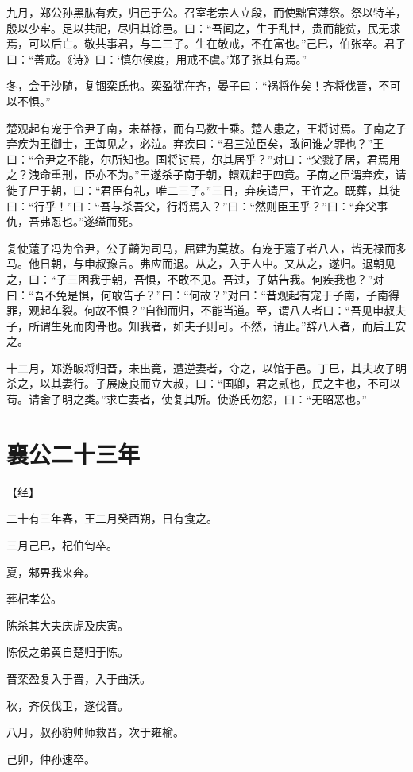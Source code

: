 \documentclass[a4paper,12pt,UTF8,twoside]{ctexbook}
\begin{document}
九月，郑公孙黑肱有疾，归邑于公。召室老宗人立段，而使黜官薄祭。祭以特羊，殷以少牢。足以共祀，尽归其馀邑。曰：“吾闻之，生于乱世，贵而能贫，民无求焉，可以后亡。敬共事君，与二三子。生在敬戒，不在富也。”己巳，伯张卒。君子曰：“善戒。《诗》曰：‘慎尔侯度，用戒不虞。’郑子张其有焉。”

冬，会于沙随，复锢栾氏也。栾盈犹在齐，晏子曰：“祸将作矣！齐将伐晋，不可以不惧。”

楚观起有宠于令尹子南，未益禄，而有马数十乘。楚人患之，王将讨焉。子南之子弃疾为王御士，王每见之，必泣。弃疾曰：“君三泣臣矣，敢问谁之罪也？”王曰：“令尹之不能，尔所知也。国将讨焉，尔其居乎？”对曰：“父戮子居，君焉用之？洩命重刑，臣亦不为。”王遂杀子南于朝，轘观起于四竟。子南之臣谓弃疾，请徙子尸于朝，曰：“君臣有礼，唯二三子。”三日，弃疾请尸，王许之。既葬，其徒曰：“行乎！”曰：“吾与杀吾父，行将焉入？”曰：“然则臣王乎？”曰：“弃父事仇，吾弗忍也。”遂缢而死。

复使薳子冯为令尹，公子齮为司马，屈建为莫敖。有宠于薳子者八人，皆无禄而多马。他日朝，与申叔豫言。弗应而退。从之，入于人中。又从之，遂归。退朝见之，曰：“子三困我于朝，吾惧，不敢不见。吾过，子姑告我。何疾我也？”对曰：“吾不免是惧，何敢告子？”曰：“何故？”对曰：“昔观起有宠于子南，子南得罪，观起车裂。何故不惧？”自御而归，不能当道。至，谓八人者曰：“吾见申叔夫子，所谓生死而肉骨也。知我者，如夫子则可。不然，请止。”辞八人者，而后王安之。

十二月，郑游眅将归晋，未出竟，遭逆妻者，夺之，以馆于邑。丁巳，其夫攻子明杀之，以其妻行。子展废良而立大叔，曰：“国卿，君之贰也，民之主也，不可以苟。请舍子明之类。”求亡妻者，使复其所。使游氏勿怨，曰：“无昭恶也。”

\section{襄公二十三年}



【经】

二十有三年春，王二月癸酉朔，日有食之。

三月己巳，杞伯匄卒。

夏，邾畀我来奔。

葬杞孝公。

陈杀其大夫庆虎及庆寅。

陈侯之弟黄自楚归于陈。

晋栾盈复入于晋，入于曲沃。

秋，齐侯伐卫，遂伐晋。

八月，叔孙豹帅师救晋，次于雍榆。

己卯，仲孙速卒。
\end{document}
